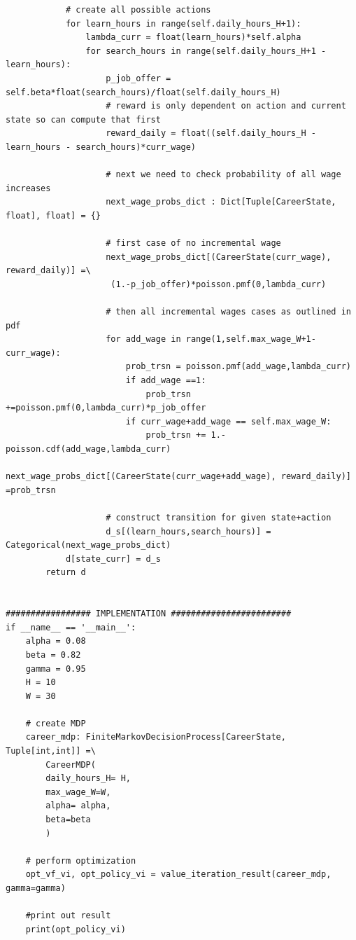 \documentclass{article}[12pt]
\begin{document}
\begin{lstlisting}
            # create all possible actions
            for learn_hours in range(self.daily_hours_H+1):
                lambda_curr = float(learn_hours)*self.alpha
                for search_hours in range(self.daily_hours_H+1 - learn_hours):
                    p_job_offer = self.beta*float(search_hours)/float(self.daily_hours_H)
                    # reward is only dependent on action and current state so can compute that first
                    reward_daily = float((self.daily_hours_H - learn_hours - search_hours)*curr_wage)
                    
                    # next we need to check probability of all wage increases
                    next_wage_probs_dict : Dict[Tuple[CareerState, float], float] = {}
                    
                    # first case of no incremental wage
                    next_wage_probs_dict[(CareerState(curr_wage), reward_daily)] =\
                     (1.-p_job_offer)*poisson.pmf(0,lambda_curr)

                    # then all incremental wages cases as outlined in pdf
                    for add_wage in range(1,self.max_wage_W+1-curr_wage):
                        prob_trsn = poisson.pmf(add_wage,lambda_curr)
                        if add_wage ==1:
                            prob_trsn +=poisson.pmf(0,lambda_curr)*p_job_offer
                        if curr_wage+add_wage == self.max_wage_W:
                            prob_trsn += 1.-poisson.cdf(add_wage,lambda_curr)
                        next_wage_probs_dict[(CareerState(curr_wage+add_wage), reward_daily)] =prob_trsn

                    # construct transition for given state+action
                    d_s[(learn_hours,search_hours)] = Categorical(next_wage_probs_dict)
            d[state_curr] = d_s
        return d


################# IMPLEMENTATION ########################
if __name__ == '__main__':
    alpha = 0.08
    beta = 0.82
    gamma = 0.95
    H = 10
    W = 30

    # create MDP
    career_mdp: FiniteMarkovDecisionProcess[CareerState, Tuple[int,int]] =\
        CareerMDP(
        daily_hours_H= H,
        max_wage_W=W,
        alpha= alpha,
        beta=beta
        )

    # perform optimization
    opt_vf_vi, opt_policy_vi = value_iteration_result(career_mdp, gamma=gamma)

    #print out result
    print(opt_policy_vi)
   \end{lstlisting}
\end{document}
